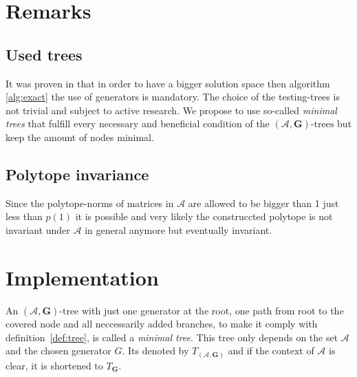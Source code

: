 \section{Remarks}

\subsection*{Used trees}
It was proven in \citep{mollerTreebasedApproachJoint2014} that in order to have a bigger solution space then algorithm \ref{alg:exact} the use of generators is mandatory. 
The choice of the testing-trees is not trivial and subject to active research. 
We propose to use so-called \emph{minimal trees} that fulfill every necessary and beneficial condition of the $(\mathcal{A},\mathbf{G})\text{-trees}$ but keep the amount of nodes minimal.

\subsection*{Polytope invariance}
Since the polytope-norms of matrices in $\mathcal{A}$ are allowed to be bigger than 1 just less than $p(1)$ it is possible and very likely the construccted polytope is not invariant under $\mathcal{A}$ in general anymore but eventually invariant.

\section{Implementation}

\begin{definition}
  An $(\mathcal{A},\mathbf{G})\text{-tree}$ with just one generator at the root, one path from root to the covered node and all neccessarily added branches, to make it comply with definition~\ref{def:tree}, is called a \emph{minimal tree}. This tree only depends on the set $\mathcal{A}$ and the chosen generator $G$. Its denoted by $T_{(\mathcal{A},\mathbf{G})}$ and if the context of $\mathcal{A}$ is clear, it is shortened to $T_\mathbf{G}$.
\end{definition}


